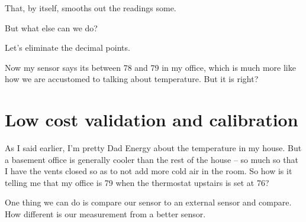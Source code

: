 \documentclass[
]{book}
\newenvironment{Shaded}{\begin{snugshade}}{\end{snugshade}}
\newcommand{\BuiltInTok}[1]{#1}
\newcommand{\CommentTok}[1]{\textcolor[rgb]{0.56,0.35,0.01}{\textit{#1}}}
\newcommand{\ControlFlowTok}[1]{\textcolor[rgb]{0.13,0.29,0.53}{\textbf{#1}}}
\newcommand{\DecValTok}[1]{\textcolor[rgb]{0.00,0.00,0.81}{#1}}
\newcommand{\FloatTok}[1]{\textcolor[rgb]{0.00,0.00,0.81}{#1}}
\newcommand{\ImportTok}[1]{#1}
\newcommand{\KeywordTok}[1]{\textcolor[rgb]{0.13,0.29,0.53}{\textbf{#1}}}
\newcommand{\NormalTok}[1]{#1}
\newcommand{\OperatorTok}[1]{\textcolor[rgb]{0.81,0.36,0.00}{\textbf{#1}}}
\newcommand{\StringTok}[1]{\textcolor[rgb]{0.31,0.60,0.02}{#1}}
\newcommand{\VariableTok}[1]{\textcolor[rgb]{0.00,0.00,0.00}{#1}}
\begin{document}
That, by itself, smooths out the readings some.

But what else can we do?

Let's eliminate the decimal points.

\begin{Shaded}
\end{Shaded}

Now my sensor says its between 78 and 79 in my office, which is much more like how we are accustomed to talking about temperature. But it is right?

\hypertarget{low-cost-validation-and-calibration}{%
\section{Low cost validation and calibration}\label{low-cost-validation-and-calibration}}

As I said earlier, I'm pretty Dad Energy about the temperature in my house. But a basement office is generally cooler than the rest of the house -- so much so that I have the vents closed so as to not add more cold air in the room. So how is it telling me that my office is 79 when the thermostat upstairs is set at 76?

One thing we can do is compare our sensor to an external sensor and compare. How different is our measurement from a better sensor.
\end{document}
